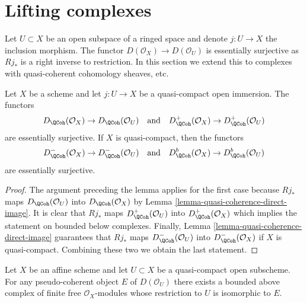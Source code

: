 \section{Lifting complexes}
\label{section-lift}

\noindent
Let $U \subset X$ be an open subspace of a ringed space
and denote $j : U \to X$ the inclusion morphism. The functor
$D(\mathcal{O}_X) \to D(\mathcal{O}_U)$ is essentially surjective as
$Rj_*$ is a right inverse to restriction.
In this section we extend this to complexes with quasi-coherent cohomology
sheaves, etc.

\begin{lemma}
\label{lemma-lift-quasi-coherent}
Let $X$ be a scheme and let $j : U \to X$ be a quasi-compact
open immersion. The functors
$$
D_\QCoh(\mathcal{O}_X) \to D_\QCoh(\mathcal{O}_U)
\quad\text{and}\quad
D^+_\QCoh(\mathcal{O}_X) \to D^+_\QCoh(\mathcal{O}_U)
$$
are essentially surjective. If $X$ is quasi-compact, then the functors
$$
D^-_\QCoh(\mathcal{O}_X) \to D^-_\QCoh(\mathcal{O}_U)
\quad\text{and}\quad
D^b_\QCoh(\mathcal{O}_X) \to D^b_\QCoh(\mathcal{O}_U)
$$
are essentially surjective.
\end{lemma}

\begin{proof}
The argument preceding the lemma applies for the first case because $Rj_*$
maps $D_\QCoh(\mathcal{O}_U)$ into $D_\QCoh(\mathcal{O}_X)$
by Lemma \ref{lemma-quasi-coherence-direct-image}.
It is clear that $Rj_*$ maps
$D^+_\QCoh(\mathcal{O}_U)$ into
$D^+_\QCoh(\mathcal{O}_X)$
which implies the statement on bounded below complexes.
Finally, Lemma \ref{lemma-quasi-coherence-direct-image}
guarantees that $Rj_*$ maps
$D^-_\QCoh(\mathcal{O}_U)$ into
$D^-_\QCoh(\mathcal{O}_X)$
if $X$ is quasi-compact. Combining these two we obtain the last statement.
\end{proof}

\begin{lemma}
\label{lemma-lift-pseudo-coherent}
Let $X$ be an affine scheme and let $U \subset X$ be a quasi-compact
open subscheme. For any pseudo-coherent object $E$ of $D(\mathcal{O}_U)$
there exists a bounded above complex of finite free $\mathcal{O}_X$-modules 
whose restriction to $U$ is isomorphic to $E$.
\end{lemma}


